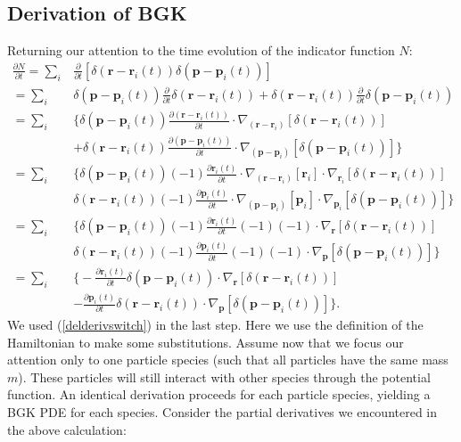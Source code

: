 \documentclass{article}
\begin{document}
\subsection{Derivation of BGK}
Returning our attention to the time evolution of the indicator function $N$:
\begin{align*}
\frac{\partial N}{\partial t}=\sum_i& \frac{\partial}{\partial t}\left[\delta(\mathbf{r}-\mathbf{r}_i(t))\delta(\mathbf{p}-\mathbf{p}_i(t))\right]\\
=\sum_i& \delta(\mathbf{p}-\mathbf{p}_i(t))\frac{\partial}{\partial t}\delta(\mathbf{r}-\mathbf{r}_i(t))+\delta(\mathbf{r}-\mathbf{r}_i(t))\frac{\partial }{\partial t}\delta(\mathbf{p}-\mathbf{p}_i(t))\\
=\sum_i&\bigg\{\delta(\mathbf{p}-\mathbf{p}_i(t))\frac{\partial(\mathbf{r}-\mathbf{r}_i(t))}{\partial t}\cdot\nabla_{(\mathbf{r}-\mathbf{r}_i)}[\delta(\mathbf{r}-\mathbf{r}_i(t))]\\
&+\delta(\mathbf{r}-\mathbf{r}_i(t))\frac{\partial(\mathbf{p}-\mathbf{p}_i(t))}{\partial t}\cdot\nabla_{(\mathbf{p}-\mathbf{p}_i)}[\delta(\mathbf{p}-\mathbf{p}_i(t))]\bigg\}\\
=\sum_i&\bigg\{\delta(\mathbf{p}-\mathbf{p}_i(t))(-1)\frac{\partial \mathbf{r}_i(t)}{\partial t}\cdot\nabla_{(\mathbf{r}-\mathbf{r}_i)}[\mathbf{r}_i]\cdot\nabla_{\mathbf{r}_i}[\delta(\mathbf{r}-\mathbf{r}_i(t))]\\
&\delta(\mathbf{r}-\mathbf{r}_i(t))(-1)\frac{\partial \mathbf{p}_i(t)}{\partial t}\cdot\nabla_{(\mathbf{p}-\mathbf{p}_i)}[\mathbf{p}_i]\cdot\nabla_{\mathbf{p}_i}[\delta(\mathbf{p}-\mathbf{p}_i(t))]\bigg\}\\
=\sum_i&\bigg\{\delta(\mathbf{p}-\mathbf{p}_i(t))(-1)\frac{\partial \mathbf{r}_i(t)}{\partial t}(-1)(-1)\cdot\nabla_{\mathbf{r}}[\delta(\mathbf{r}-\mathbf{r}_i(t))]\\
&\delta(\mathbf{r}-\mathbf{r}_i(t))(-1)\frac{\partial \mathbf{p}_i(t)}{\partial t}(-1)(-1)\cdot\nabla_{\mathbf{p}}[\delta(\mathbf{p}-\mathbf{p}_i(t))]\bigg\}\\
=\sum_i&\bigg\{-\frac{\partial \mathbf{r}_i(t)}{\partial t}\delta(\mathbf{p}-\mathbf{p}_i(t))\cdot \nabla_\mathbf{r}[\delta(\mathbf{r}-\mathbf{r}_i(t))]\\&-\frac{\partial \mathbf{p}_i(t)}{\partial t}\delta(\mathbf{r}-\mathbf{r}_i(t))\cdot \nabla_\mathbf{p}[\delta(\mathbf{p}-\mathbf{p}_i(t))]\bigg\}.
\end{align*}We used (\ref{delderivswitch}) in the last step. Here we use the definition of the Hamiltonian to make some substitutions. Assume now that we focus our attention only to one particle species (such that all particles have the same mass $m$). These particles will still interact with other species through the potential function. An identical derivation proceeds for each particle species, yielding a BGK PDE for each species. Consider the partial derivatives we encountered in the above calculation:
\end{document}
